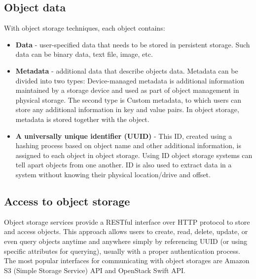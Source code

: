     \subsection*{Object data}
    With object storage techniques, each object contains\cite{ibmObjectStorage}:
    \begin{itemize}
      \item \textbf{Data} - user-specified data that needs to be stored in persistent storage. Such data can be binary data, text file, image, etc.
      \item \textbf{Metadata} - additional data that describe objects data. Metadata can be divided into two types: Device-managed metadata is additional information maintained by a storage device and used as part of object management in physical storage\cite{objectBasedStorage}. The second type is Custom metadata, to which users can store any additional information in key and value pairs. In object storage, metadata is stored together with the object.
      \item \textbf{A universally unique identifier (UUID)} - This ID, created using a hashing process based on object name and other additional information, is assigned to each object in object storage. Using ID object storage systems can tell apart objects from one another. ID is also used to extract data in a system without knowing their physical location/drive and offset.
    \end{itemize}

    \subsection*{Access to object storage}
    Object storage services provide a RESTful interface \cite{cloudObjectStorage} over HTTP protocol to store and access objects. This approach allows users to create, read, delete, update, or even query objects anytime and anywhere simply by referencing UUID (or using specific attributes for querying), usually with a proper authentication process. The most popular interfaces for communicating with object storages are Amazon S3 (Simple Storage Service) API and OpenStack Swift API.

